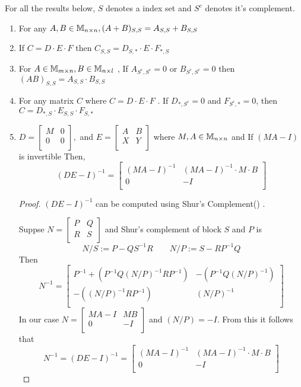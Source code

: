 \begin{HXf}
For all the results below, $S$ denotes a index set and $S^c$ denotes it's complement.
 \begin{enumerate}
  \item For any $A,B \in \mathbb{M}_{n \times n}, (A + B)_{S,S} = A_{S,S} + B_{S,S}$
  \item If $C = D \cdot E \cdot F$ then $C_{S,S} = D_{S,*} \cdot E \cdot F_{*,S}$
  \item For $A \in \mathbb{M}_{m \times n}, B \in \mathbb{M}_{n \times l}$ , If $A_{S^c, S^c} = 0$ or $B_{S^c, S^c} = 0$ then \\ $(AB)_{S,S} = A_{S,S} \cdot B_{S,S}$
  \item For any matrix $C$ where $C = D \cdot E \cdot F$ . If $D_{*, S^c} = 0$ and $F_{S^c, *} = 0$, then $C = D_{*, S} \cdot E_{S,S} \cdot F_{S,*}$
  \item $D = 
\begin{bmatrix}
M & 0 \\
0 & 0 \\
\end{bmatrix},
$ 
and $
E = 
\begin{bmatrix}
A & B \\
X & Y \\
\end{bmatrix}
$
where $M, A \in \mathbb{M}_{n \times n}$ and If $(MA - I)$ is invertible Then,
$$ (DE - I)^{-1} = \begin{bmatrix}
(MA - I)^{-1} & (MA - I)^{-1} \cdot M \cdot B \\
0 & -I \\
\end{bmatrix}
$$
\begin{proof}
 $(DE - I)^{-1}$ can be computed using Shur's Complement(\cite{wiki:shur}) . 
 
 Suppse $N =  
\begin{bmatrix}
P & Q \\
R & S \\
\end{bmatrix}
$ and Shur's complement of block $S$ and $P$ is  $$N / S := P - QS^{-1}R \qquad N / P := S - RP^{-1}Q$$
Then $$N^{-1} = 
\begin{bmatrix}
P^{-1} + (P^{-1} Q (N/P)^{-1} R  P^{-1}) & -(P^{-1}Q(N/P)^{-1}) \\[0.3cm]
-((N/P)^{-1}RP^{-1}) & (N/P)^{-1} \\
\end{bmatrix}
$$
In our case $N = 
\begin{bmatrix}
MA - I & MB \\
0 & -I \\
\end{bmatrix}
$ and $(N/P) = -I$. From this it follows that $$N^{-1} = (DE-I)^{-1} = \begin{bmatrix}
(MA - I)^{-1} & (MA - I)^{-1} \cdot M \cdot B \\
0 & -I \\
\end{bmatrix}
$$
\end{proof}

 \end{enumerate}

\end{HXf}
